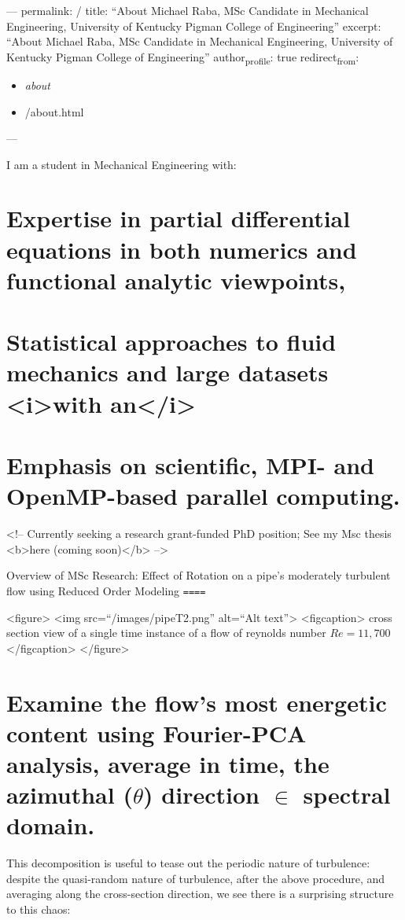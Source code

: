 \documentclass[11pt]{article}
\author{Michael Raba}
\date{\today}
\title{}
\begin{document}
\tableofcontents

---
permalink: /
title: ``About Michael Raba, MSc Candidate in Mechanical Engineering, University of Kentucky Pigman College of Engineering''
excerpt: ``About Michael Raba, MSc Candidate in Mechanical Engineering, University of Kentucky Pigman College of Engineering''
author\textsubscript{profile}: true
redirect\textsubscript{from}: 
\begin{itemize}
\item \emph{about}
\item /about.html
\end{itemize}
---

I am a student in Mechanical Engineering with:
\section{Expertise in partial differential equations in both numerics and functional analytic viewpoints,}
\label{sec:org1aad427}
\section{Statistical approaches to fluid mechanics and large datasets <i>with an</i>}
\label{sec:orgf9c1e32}
\section{Emphasis on scientific, MPI- and OpenMP-based parallel computing.}
\label{sec:org0daa0bb}

<!-- Currently seeking a research grant-funded PhD position; See my Msc thesis <b>here (coming soon)</b> -->

Overview of MSc Research: Effect of Rotation on a pipe's moderately turbulent flow using Reduced Order Modeling
\texttt{====}

<figure>
  <img src=``/images/pipeT2.png'' alt=``Alt text''>
  <figcaption>
cross section view of a single time instance of a flow of reynolds number \(Re=11,700\)
</figcaption>
</figure>

\section{Examine the flow's most energetic content \textbf{using Fourier-PCA analysis}, average in time, the azimuthal (\(\theta\)) direction \(\in\) spectral domain.}
\label{sec:org1abf2e2}

This decomposition is useful to tease out the periodic nature of turbulence: despite the quasi-random nature of turbulence, after the above procedure, and averaging along the cross-section direction, we see there is a surprising structure to this chaos:
\end{document}
